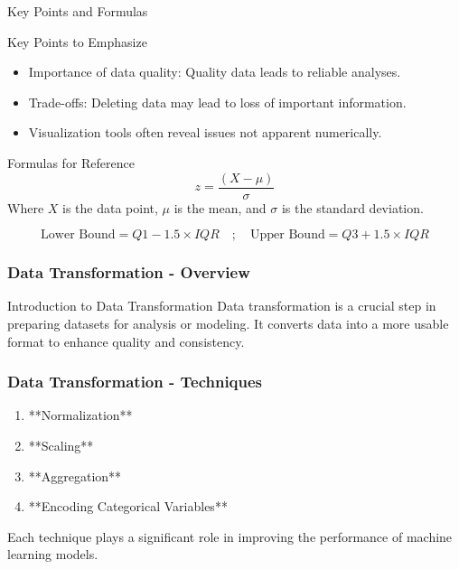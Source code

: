 \documentclass[aspectratio=169]{beamer}
\begin{document}
\begin{frame}[fragile]{Key Points and Formulas}
  \begin{block}{Key Points to Emphasize}
    \begin{itemize}
      \item Importance of data quality: Quality data leads to reliable analyses.
      \item Trade-offs: Deleting data may lead to loss of important information.
      \item Visualization tools often reveal issues not apparent numerically.
    \end{itemize}
  \end{block}
  
  \begin{block}{Formulas for Reference}
    \begin{equation}
      z = \frac{(X - \mu)}{\sigma}
    \end{equation}
    Where \( X \) is the data point, \( \mu \) is the mean, and \( \sigma \) is the standard deviation.
    
    \begin{equation}
      \text{Lower Bound} = Q1 - 1.5 \times IQR \quad ; \quad \text{Upper Bound} = Q3 + 1.5 \times IQR
    \end{equation}
  \end{block}
\end{frame}

\begin{frame}[fragile]
    \frametitle{Data Transformation - Overview}
    \begin{block}{Introduction to Data Transformation}
        Data transformation is a crucial step in preparing datasets for analysis or modeling. It converts data into a more usable format to enhance quality and consistency.
    \end{block}
\end{frame}

\begin{frame}[fragile]
    \frametitle{Data Transformation - Techniques}
    \begin{enumerate}
        \item **Normalization**
        \item **Scaling**
        \item **Aggregation**
        \item **Encoding Categorical Variables**
    \end{enumerate}
    Each technique plays a significant role in improving the performance of machine learning models.
\end{frame}
\end{document}
